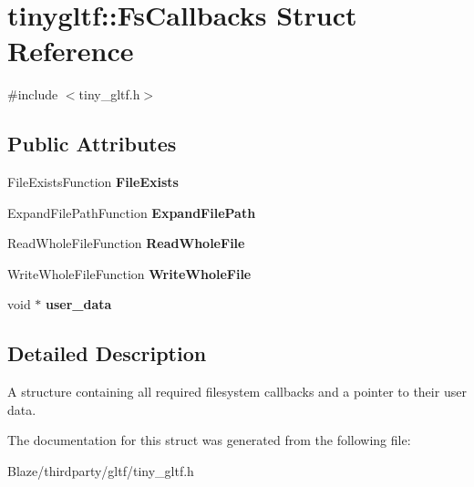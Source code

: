 \hypertarget{structtinygltf_1_1FsCallbacks}{}\section{tinygltf\+:\+:Fs\+Callbacks Struct Reference}
\label{structtinygltf_1_1FsCallbacks}


{\ttfamily \#include $<$tiny\+\_\+gltf.\+h$>$}

\subsection*{Public Attributes}
\begin{DoxyCompactItemize}
\item 
\mbox{\label{structtinygltf_1_1FsCallbacks_aafd72c1aadccb2593bbd5831825bf146}} 
File\+Exists\+Function {\bfseries File\+Exists}
\item 
\mbox{\label{structtinygltf_1_1FsCallbacks_a5b6fe6275496177b0f90e3f8973f8189}} 
Expand\+File\+Path\+Function {\bfseries Expand\+File\+Path}
\item 
\mbox{\label{structtinygltf_1_1FsCallbacks_a12308778015f7c1fa51d9142bccf5a7c}} 
Read\+Whole\+File\+Function {\bfseries Read\+Whole\+File}
\item 
\mbox{\label{structtinygltf_1_1FsCallbacks_ae4ee45fcb817282585c9ccab443f47da}} 
Write\+Whole\+File\+Function {\bfseries Write\+Whole\+File}
\item 
\mbox{\label{structtinygltf_1_1FsCallbacks_a0e4ab9910a6b93004bd3b74994227657}} 
void $\ast$ {\bfseries user\+\_\+data}
\end{DoxyCompactItemize}


\subsection{Detailed Description}
A structure containing all required filesystem callbacks and a pointer to their user data. 

The documentation for this struct was generated from the following file\+:\begin{DoxyCompactItemize}
\item 
Blaze/thirdparty/gltf/tiny\+\_\+gltf.\+h\end{DoxyCompactItemize}
